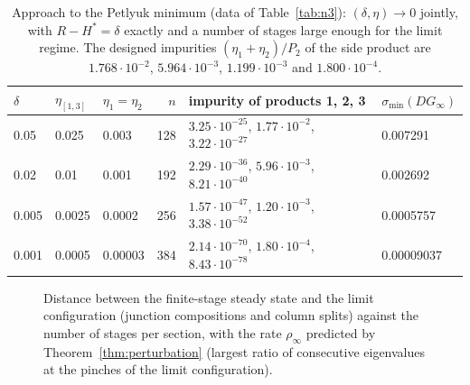 \documentclass[11pt,a4paper]{report}
\newcommand{\Hs}{H^{*}}
\begin{document}
\begin{table}[t]
\centering\footnotesize\setlength{\tabcolsep}{4pt}
\caption{Approach to the Petlyuk minimum (data of Table~\ref{tab:n3}): \((\delta,\eta)\to0\) jointly, with \(R-\Hs=\delta\) exactly
and a number of stages large enough for the limit regime. The designed impurities \((\eta_1+\eta_2)/P_2\) of the side product
are \(1.768\cdot10^{-2}\), \(5.964\cdot10^{-3}\), \(1.199\cdot10^{-3}\) and \(1.800\cdot10^{-4}\).}\label{tab:approach}
\begin{tabular}{@{}lllrll@{}}
\toprule
\(\delta\) & \(\eta_{[1,3]}\) & \(\eta_1=\eta_2\) & \(n\) & impurity of products 1, 2, 3 & \(\sigma_{\min}(DG_\infty)\)\\
\midrule
0.05 & 0.025 & 0.003 & 128 & \(3.25\cdot10^{-25}\), \(1.77\cdot10^{-2}\), \(3.22\cdot10^{-27}\) & 0.007291\\
0.02 & 0.01 & 0.001 & 192 & \(2.29\cdot10^{-36}\), \(5.96\cdot10^{-3}\), \(8.21\cdot10^{-40}\) & 0.002692\\
0.005 & 0.0025 & 0.0002 & 256 & \(1.57\cdot10^{-47}\), \(1.20\cdot10^{-3}\), \(3.38\cdot10^{-52}\) & 0.0005757\\
0.001 & 0.0005 & 0.00003 & 384 & \(2.14\cdot10^{-70}\), \(1.80\cdot10^{-4}\), \(8.43\cdot10^{-78}\) & 0.00009037\\
\bottomrule
\end{tabular}
\end{table}

\begin{figure}[t]
\centering
{}
\caption{Distance between the finite-stage steady state and the limit configuration (junction compositions and column
splits) against the number of stages per section, with the rate \(\rho_\infty\) predicted by Theorem~\ref{thm:perturbation}
(largest ratio of consecutive eigenvalues at the pinches of the limit configuration).}\label{fig:rate}
\end{figure}
\end{document}
